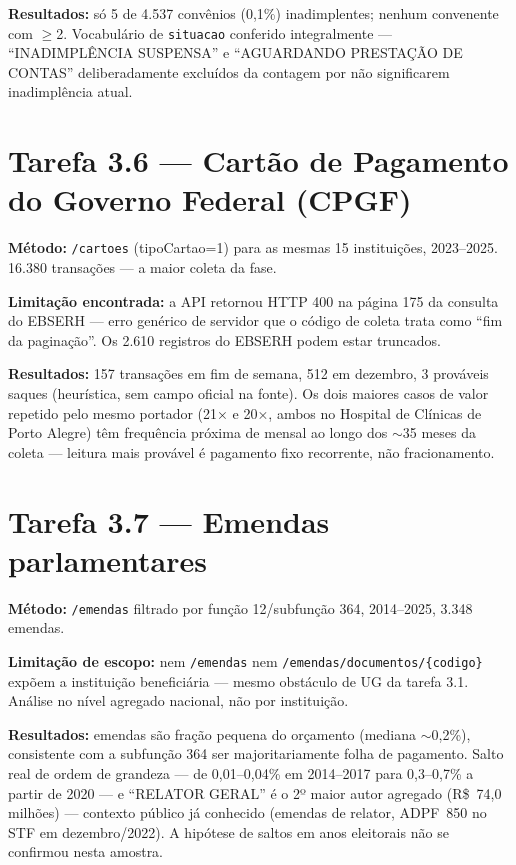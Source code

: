 \documentclass[11pt,a4paper]{article}
\begin{document}
\textbf{Resultados:} só 5 de 4.537 convênios (0,1\%) inadimplentes;
nenhum convenente com $\geq$2. Vocabulário de \texttt{situacao} conferido
integralmente --- ``INADIMPLÊNCIA SUSPENSA'' e ``AGUARDANDO PRESTAÇÃO DE
CONTAS'' deliberadamente excluídos da contagem por não significarem
inadimplência atual.

\section{Tarefa 3.6 --- Cartão de Pagamento do Governo Federal (CPGF)}

\textbf{Método:} \texttt{/cartoes} (tipoCartao=1) para as mesmas 15
instituições, 2023--2025. 16.380 transações --- a maior coleta da fase.

\textbf{Limitação encontrada:} a API retornou HTTP 400 na página 175 da
consulta do EBSERH --- erro genérico de servidor que o código de coleta
trata como ``fim da paginação''. Os 2.610 registros do EBSERH podem estar
truncados.

\textbf{Resultados:} 157 transações em fim de semana, 512 em dezembro, 3
prováveis saques (heurística, sem campo oficial na fonte). Os dois
maiores casos de valor repetido pelo mesmo portador (21× e 20×, ambos no
Hospital de Clínicas de Porto Alegre) têm frequência próxima de mensal ao
longo dos ${\sim}$35 meses da coleta --- leitura mais provável é
pagamento fixo recorrente, não fracionamento.

\section{Tarefa 3.7 --- Emendas parlamentares}

\textbf{Método:} \texttt{/emendas} filtrado por função 12/subfunção 364,
2014--2025, 3.348 emendas.

\textbf{Limitação de escopo:} nem \texttt{/emendas} nem
\texttt{/emendas/documentos/\{codigo\}} expõem a instituição beneficiária
--- mesmo obstáculo de UG da tarefa 3.1. Análise no nível agregado
nacional, não por instituição.

\textbf{Resultados:} emendas são fração pequena do orçamento (mediana
${\sim}$0,2\%), consistente com a subfunção 364 ser majoritariamente
folha de pagamento. Salto real de ordem de grandeza --- de 0,01--0,04\%
em 2014--2017 para 0,3--0,7\% a partir de 2020 --- e ``RELATOR GERAL'' é
o 2º maior autor agregado (R\$~74,0 milhões) --- contexto público já
conhecido (emendas de relator, ADPF~850 no STF em dezembro/2022). A
hipótese de saltos em anos eleitorais não se confirmou nesta amostra.
\end{document}
